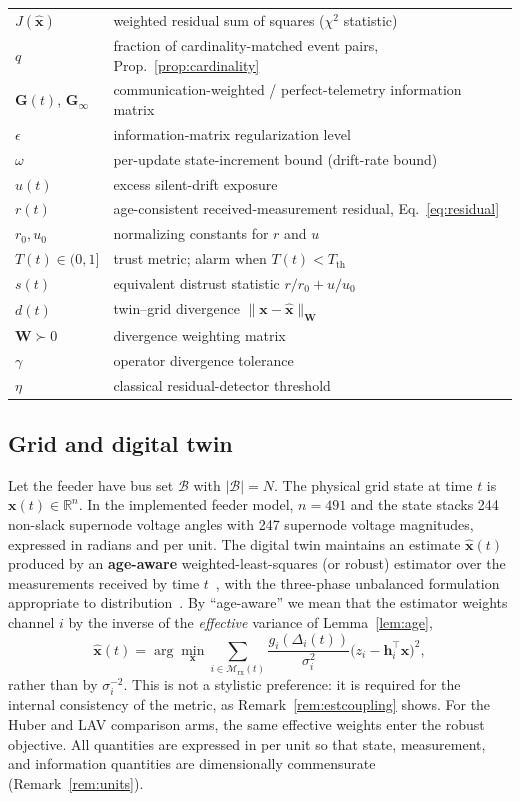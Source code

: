 \documentclass[journal]{IEEEtran}
\theoremstyle{plain}
\theoremstyle{definition}
\theoremstyle{remark}
\newcommand{\bx}{\mathbf{x}}
\newcommand{\bxh}{\hat{\mathbf{x}}}
\newcommand{\bh}{\mathbf{h}}
\newcommand{\bG}{\mathbf{G}}
\newcommand{\bW}{\mathbf{W}}
\newcommand{\Mrx}{\mathcal{M}_{\mathrm{rx}}}
\begin{document}
\begin{table}[!t]
\begin{tabular}{@{}l p{5.6cm}@{}}
$J(\bxh)$ & weighted residual sum of squares ($\chi^{2}$ statistic) \\
$q$ & fraction of cardinality-matched event pairs, Prop.~\ref{prop:cardinality} \\
$\bG(t)$, $\bG_{\infty}$ & communication-weighted / perfect-telemetry information matrix \\
$\epsilon$ & information-matrix regularization level \\
$\omega$ & per-update state-increment bound (drift-rate bound) \\
$u(t)$ & excess silent-drift exposure \\
$r(t)$ & age-consistent received-measurement residual, Eq.~\eqref{eq:residual} \\
$r_0,u_0$ & normalizing constants for $r$ and $u$ \\
$T(t)\in(0,1]$ & trust metric; alarm when $T(t)<T_{\mathrm{th}}$ \\
$s(t)$ & equivalent distrust statistic $r/r_0+u/u_0$ \\
$d(t)$ & twin--grid divergence $\lVert\bx-\bxh\rVert_{\bW}$ \\
$\bW\succ0$ & divergence weighting matrix \\
$\gamma$ & operator divergence tolerance \\
$\eta$ & classical residual-detector threshold \\
\bottomrule
\end{tabular}
\end{table}

\subsection{Grid and digital twin}
Let the feeder have bus set $\mathcal{B}$ with $|\mathcal{B}|=N$. The
physical grid state at time $t$ is $\bx(t)\in\mathbb{R}^{n}$. In the
implemented feeder model, $n=491$ and the state stacks 244 non-slack
supernode voltage angles with 247 supernode voltage magnitudes, expressed
in radians and per unit. The digital twin maintains an
estimate $\bxh(t)$ produced by an \textbf{age-aware} weighted-least-squares
(or robust) estimator over the measurements received by time
$t$~\cite{abur2004,monticelli1999}, with the three-phase unbalanced
formulation appropriate to distribution~\cite{baran1994,singh2009}. By
``age-aware'' we mean that the estimator weights channel $i$ by the inverse
of the \emph{effective} variance of Lemma~\ref{lem:age},
\begin{equation}
\bxh(t)=\arg\min_{\bx}\sum_{i\in\Mrx(t)}
\frac{g_i(\Delta_i(t))}{\sigma_i^{2}}\big(z_i-\bh_i^{\top}\bx\big)^{2},
\label{eq:estimator}
\end{equation}
rather than by $\sigma_i^{-2}$. This is not a stylistic preference: it is
required for the internal consistency of the metric, as
Remark~\ref{rem:estcoupling} shows. For the Huber and LAV comparison
arms, the same effective weights enter the robust objective. All
quantities are expressed in per unit so that state, measurement, and
information quantities are dimensionally commensurate
(Remark~\ref{rem:units}).
\end{document}
